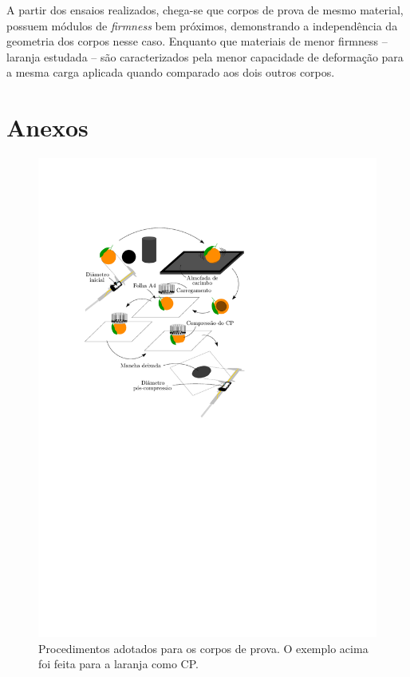 \documentclass[a4paper, brazilian]{article}
\begin{document}
	A partir dos ensaios realizados, chega-se que corpos de prova de mesmo material, possuem módulos de \textit{firmness} bem próximos, demonstrando a independência da geometria dos corpos nesse caso. Enquanto que materiais de  menor firmness -- laranja estudada -- são caracterizados pela menor capacidade de deformação para a mesma carga aplicada quando comparado aos dois outros corpos.
	
	\section{Anexos}
	
	\begin{figure}[H]
		\centering
		\includegraphics[scale=1]{images/xp3}
		\caption{Procedimentos adotados para os corpos de prova. O exemplo acima foi feita para a laranja como CP.}
		\label{fig:method}
	\end{figure}
\end{document}
